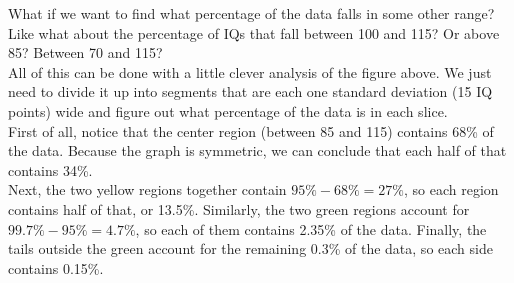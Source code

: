 \begin{center}
\end{center}
\vfill

What if we want to find what percentage of the data falls in some other range?  Like what about the percentage of IQs that fall between 100 and 115?  Or above 85?  Between 70 and 115?\\

All of this can be done with a little clever analysis of the figure above.  We just need to divide it up into segments that are each one standard deviation (15 IQ points) wide and figure out what percentage of the data is in each slice.\\

First of all, notice that the center region (between 85 and 115) contains 68\% of the data.  Because the graph is symmetric, we can conclude that each half of that contains 34\%.\\

Next, the two yellow regions together contain $95\%-68\% = 27\%$, so each region contains half of that, or 13.5\%.  Similarly, the two green regions account for $99.7\%-95\% = 4.7\%$, so each of them contains 2.35\% of the data.  Finally, the tails outside the green account for the remaining 0.3\% of the data, so each side contains 0.15\%.\\
\vfill

